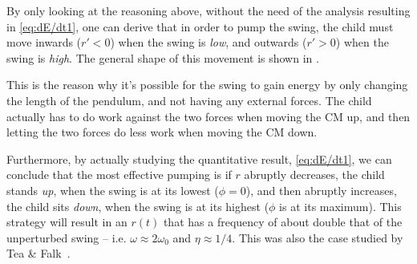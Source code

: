 \documentclass[11pt,letter, swedish, english
]{article}
\begin{document}
By only looking at the reasoning above, without the need of the
analysis resulting in \eqref{eq:dE/dt1}, one can derive that in
order to pump the swing, the child must move inwards ($r'<0$) when the
swing is \emph{low}, and outwards ($r'>0$) when the swing is 
\emph{high}. The general shape of this movement is shown in
. 


This is the reason why it's possible for the swing to gain energy by
only changing the length of the pendulum, and not having any external
forces. The child actually has to do work against the two forces when
moving the CM up, and then letting  the two forces do less work
when moving the CM down.

Furthermore, by actually studying the quantitative result,
\eqref{eq:dE/dt1}, we can conclude that the most effective pumping
is if $r$ abruptly decreases, the child stands \emph{up}, when
the swing is at its lowest ($\phi=0$), and then abruptly increases,
the child sits \emph{down}, when the swing is at its highest ($\phi$
is at its maximum). This strategy will result in an $r(t)$ that has a 
frequency of about double that of the unperturbed swing --
i.e. $\omega\approx2\omega_0$ and $\eta\approx1/4$. 
This was also the case studied by Tea \& Falk~\cite{Tea_Falk_1968}.


\end{document}
